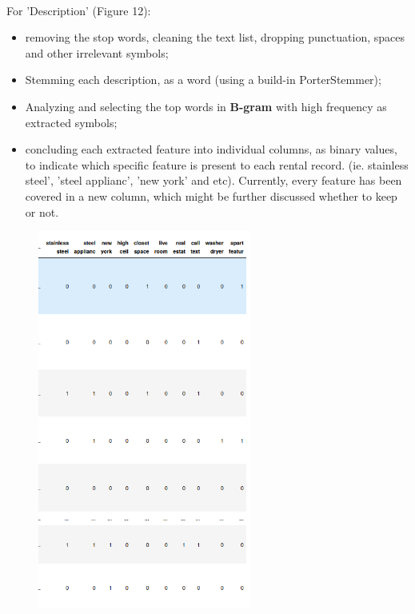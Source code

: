 \documentclass[10pt,twocolumn,letterpaper]{article}
\begin{document}
\\ For 'Description' (Figure 12):
\begin{itemize}
  \item removing the stop words, cleaning the text list, dropping punctuation, spaces and other irrelevant symbols;
  \item Stemming each description, as a word (using a build-in PorterStemmer);
  \item Analyzing and selecting the top words in {\bf B-gram} with high frequency as extracted symbols;
  \item concluding each extracted feature into individual columns, as binary values, to indicate which specific feature is present to each rental record. (ie. stainless steel', 'steel applianc', 'new york' and etc). Currently, every feature has been covered in a new column, which might be further discussed whether to keep or not.
\end{itemize}


\begin{figure}[h!]
    \centering
    \includegraphics[width=7cm]{bgram.png}
    \caption{}
    \label{fig:galaxy}
\end{figure}
\end{document}
